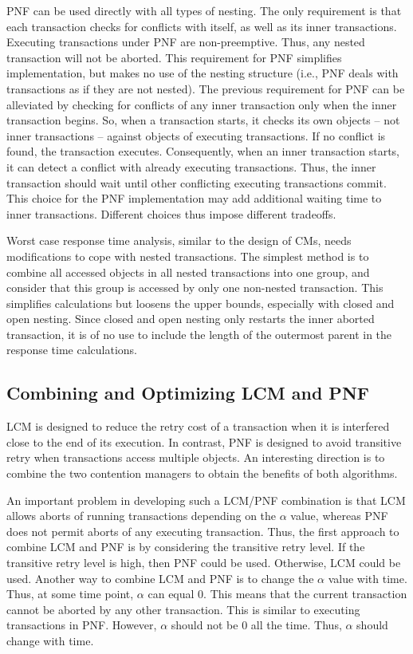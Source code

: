 \documentclass[12pt,english]{report}
\begin{document}
PNF can be used directly with all types of nesting. The only requirement is that each transaction checks for conflicts with itself, as well as its inner transactions. Executing transactions under PNF are non-preemptive. Thus, any nested transaction will not be aborted. This requirement for PNF simplifies implementation, but makes no use of the nesting structure (i.e., PNF deals with transactions as if they are not nested). The previous requirement for PNF can be alleviated by checking for conflicts of any inner transaction only when the inner transaction begins. So, when a transaction starts, it checks its own objects -- not inner transactions -- against objects of executing transactions. If no conflict is found, the transaction executes. Consequently, when an inner transaction starts, it can detect a conflict with already executing transactions. Thus, the inner transaction should wait until other conflicting executing transactions commit. This choice for the PNF implementation may add additional waiting time to inner transactions. Different choices thus impose different tradeoffs. 


Worst case response time analysis, similar to the design of CMs, needs modifications  to cope with nested transactions. The simplest method is to combine all accessed objects in all nested transactions into one group, and consider that this group is accessed by only one non-nested transaction. This simplifies calculations but loosens the upper bounds, especially with closed and open nesting. Since closed and open nesting only restarts the inner aborted transaction, it is of no use to include the length of the outermost parent in the response time calculations.


\subsection{Combining and Optimizing LCM and PNF} 

LCM is designed to reduce the retry cost of a transaction when it is interfered close to the end of its execution. In contrast, PNF is designed to avoid transitive retry when transactions access multiple objects. An interesting direction is to combine the two contention managers to obtain the benefits of both algorithms. 

An important problem in developing such a LCM/PNF combination is that LCM allows aborts of running transactions depending on the $\alpha$ value, whereas PNF does not permit aborts of any executing transaction. Thus, the first approach to combine LCM and PNF is by considering the transitive retry level. If the transitive retry level is high, then PNF could be used. Otherwise, LCM could be used. Another way to combine LCM and PNF is to change the $\alpha$ value with time. Thus, at some time point, $\alpha$ can equal $0$. This means that the current transaction cannot be aborted by any other transaction. This is similar to executing transactions in PNF. However, $\alpha$ should not be $0$ all the time. Thus, $\alpha$ should change with time.
\end{document}
